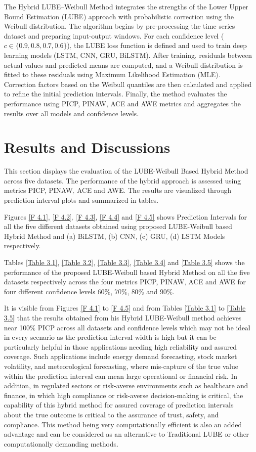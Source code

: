 The Hybrid LUBE–Weibull Method integrates the strengths of the Lower Upper Bound Estimation (LUBE) approach with probabilistic correction using the Weibull distribution. The algorithm begins by pre-processing the time series dataset and preparing input-output windows. For each confidence level ($c \in \{0.9, 0.8, 0.7, 0.6\}$), the LUBE loss function is defined and used to train deep learning models (LSTM, CNN, GRU, BiLSTM). After training, residuals between actual values and predicted means are computed, and a Weibull distribution is fitted to these residuals using Maximum Likelihood Estimation (MLE). Correction factors based on the Weibull quantiles are then calculated and applied to refine the initial prediction intervals. Finally, the method evaluates the performance using PICP, PINAW, ACE and AWE metrics and aggregates the results over all models and confidence levels.


\section{Results and Discussions}
This section displays the evaluation of the LUBE-Weibull Based Hybrid Method across five datasets. The performance of the hybrid approach is assessed using metrics PICP, PINAW, ACE and AWE. The results are visualized through prediction interval plots and summarized in tables.

Figures \ref{F 4.1}, \ref{F 4.2}, \ref{F 4.3}, \ref{F 4.4} and \ref{F 4.5} shows Prediction Intervals for all the five different datasets obtained using proposed LUBE-Weibull based Hybrid Method and (a) BiLSTM, (b) CNN, (c) GRU, (d) LSTM Models respectively.

Tables \ref{Table 3.1}, \ref{Table 3.2}, \ref{Table 3.3}, \ref{Table 3.4} and \ref{Table 3.5} shows the performance of the proposed LUBE-Weibull based Hybrid Method on all the five datasets respectively across the four metrics PICP, PINAW, ACE and AWE for four different confidence levels 60\%, 70\%, 80\% and 90\%.

It is visible from Figures \ref{F 4.1} to \ref{F 4.5} and from Tables \ref{Table 3.1} to \ref{Table 3.5} that the results obtained from his Hybrid LUBE-Weibull method achieves near 100\% PICP across all datasets and confidence levels which may not be ideal in every scenario as the prediction interval width is high but it can be particularly helpful in those applications needing high reliability and assured coverage. Such applications include energy demand forecasting, stock market volatility, and meteorological forecasting, where mis-capture of the true value within the prediction interval can mean large operational or financial risk. In addition, in regulated sectors or risk-averse environments such as healthcare and finance, in which high compliance or risk-averse decision-making is critical, the capability of this hybrid method for assured coverage of prediction intervals about the true outcome is critical to the assurance of trust, safety, and compliance.
This method being very computationally efficient is also an added advantage and can be considered as an alternative to Traditional LUBE or other computationally demanding methods.

